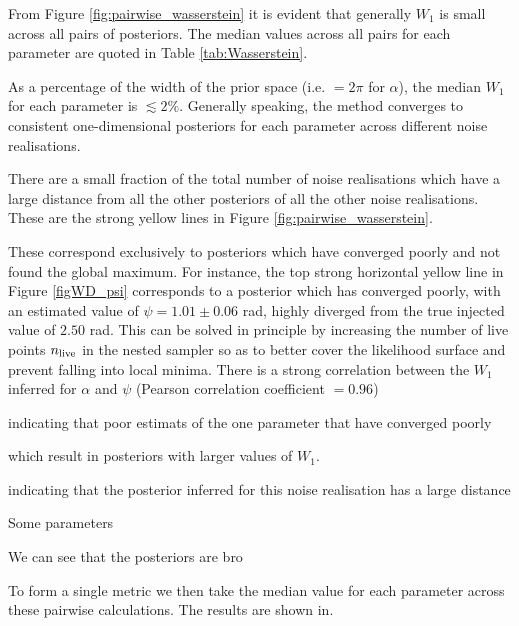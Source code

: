 \documentclass[fleqn,usenatbib,useAMS]{mnras}
\begin{document}
From Figure \ref{fig:pairwise_wasserstein} it is evident that generally $W_1$ is small across all pairs of posteriors. The median values across all pairs for each parameter are quoted in Table \ref{tab:Wasserstein}. 


As a percentage of the width of the prior space (i.e. $=2 \pi$ for $\alpha$), the median $W_1$ for each parameter is $\lesssim 2 \%$. Generally speaking, the method converges to consistent one-dimensional posteriors for each parameter across different noise realisations.


There are a small fraction of the total number of noise realisations
which have a large distance from all the other posteriors of all the other noise realisations. These are the strong yellow lines in Figure \ref{fig:pairwise_wasserstein}.



These correspond exclusively to posteriors which have converged poorly and not found the global maximum. For instance, the top strong horizontal yellow line in Figure \ref{figWD_psi} corresponds to a posterior which has converged poorly, with an estimated value of $\psi = 1.01 \pm 0.06$ rad, highly diverged from the true injected value of $2.50$ rad. This can be solved in principle by increasing the number of live points $n_{\rm live}$ in the nested sampler so as to better cover the likelihood surface and prevent falling into local minima. There is a strong correlation between the $W_1$ inferred for $\alpha$ and $\psi$ (Pearson correlation coefficient $=0.96$)



indicating that poor estimats of the one parameter that have converged poorly 





 which result in posteriors with larger values of $W_1$. 
 
 
  indicating that the posterior inferred for this noise realisation has a large distance 


Some parameters 






We can see that the posteriors are bro




To form a single metric we then take the median value for each parameter across these pairwise calculations. The results are shown in.
\end{document}
